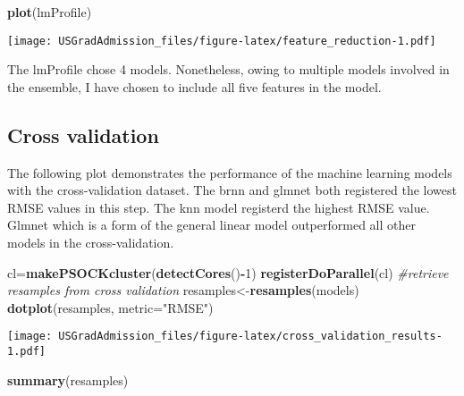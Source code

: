 \documentclass[11pt,]{article}
\newenvironment{Shaded}{\begin{snugshade}}{\end{snugshade}}
\newcommand{\CommentTok}[1]{\textcolor[rgb]{0.56,0.35,0.01}{\textit{#1}}}
\newcommand{\DataTypeTok}[1]{\textcolor[rgb]{0.13,0.29,0.53}{#1}}
\newcommand{\DecValTok}[1]{\textcolor[rgb]{0.00,0.00,0.81}{#1}}
\newcommand{\KeywordTok}[1]{\textcolor[rgb]{0.13,0.29,0.53}{\textbf{#1}}}
\newcommand{\NormalTok}[1]{#1}
\newcommand{\OperatorTok}[1]{\textcolor[rgb]{0.81,0.36,0.00}{\textbf{#1}}}
\newcommand{\StringTok}[1]{\textcolor[rgb]{0.31,0.60,0.02}{#1}}
\begin{document}
\begin{Shaded}
\begin{Highlighting}[]
\KeywordTok{plot}\NormalTok{(lmProfile)}
\end{Highlighting}
\end{Shaded}

\texttt{[image: USGradAdmission\_files/figure-latex/feature\_reduction-1.pdf]}

The lmProfile chose 4 models. Nonetheless, owing to multiple models
involved in the ensemble, I have chosen to include all five features in
the model.

\hypertarget{cross-validation}{%
\subsection{Cross validation}\label{cross-validation}}

The following plot demonstrates the performance of the machine learning
models with the cross-validation dataset. The brnn and glmnet both
registered the lowest RMSE values in this step. The knn model registerd
the highest RMSE value. Glmnet which is a form of the general linear
model outperformed all other models in the cross-validation.

\begin{Shaded}
\begin{Highlighting}[]
\NormalTok{ cl=}\KeywordTok{makePSOCKcluster}\NormalTok{(}\KeywordTok{detectCores}\NormalTok{()}\OperatorTok{-}\DecValTok{1}\NormalTok{)}
 \KeywordTok{registerDoParallel}\NormalTok{(cl)}
 \CommentTok{#retrieve resamples from cross validation}
\NormalTok{ resamples<-}\KeywordTok{resamples}\NormalTok{(models)}
 \KeywordTok{dotplot}\NormalTok{(resamples, }\DataTypeTok{metric=}\StringTok{"RMSE"}\NormalTok{)}
\end{Highlighting}
\end{Shaded}

\texttt{[image: USGradAdmission\_files/figure-latex/cross\_validation\_results-1.pdf]}

\begin{Shaded}
\begin{Highlighting}[]
 \KeywordTok{summary}\NormalTok{(resamples)}
\end{Highlighting}
\end{Shaded}
\end{document}
